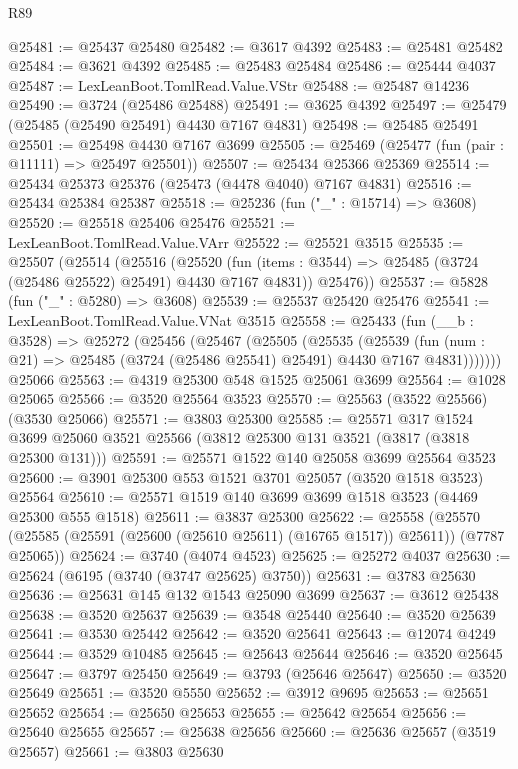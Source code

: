 \begin{lexlean}{R89}
\begin{coremodule}
@25481 := @25437 @25480
@25482 := @3617 @4392
@25483 := @25481 @25482
@25484 := @3621 @4392
@25485 := @25483 @25484
@25486 := @25444 @4037
@25487 := LexLeanBoot.TomlRead.Value.VStr
@25488 := @25487 @14236
@25490 := @3724 (@25486 @25488)
@25491 := @3625 @4392
@25497 := @25479 (@25485 (@25490 @25491) @4430 @7167 @4831)
@25498 := @25485 @25491
@25501 := @25498 @4430 @7167 @3699
@25505 := @25469 (@25477 (fun (pair : @11111) => @25497 @25501))
@25507 := @25434 @25366 @25369
@25514 := @25434 @25373 @25376 (@25473 (@4478 @4040) @7167 @4831)
@25516 := @25434 @25384 @25387
@25518 := @25236 (fun ("_" : @15714) => @3608)
@25520 := @25518 @25406 @25476
@25521 := LexLeanBoot.TomlRead.Value.VArr
@25522 := @25521 @3515
@25535 := @25507
    (@25514
      (@25516
        (@25520 (fun (items : @3544) => @25485 (@3724 (@25486 @25522) @25491) @4430 @7167 @4831))
        @25476))
@25537 := @5828 (fun ("_" : @5280) => @3608)
@25539 := @25537 @25420 @25476
@25541 := LexLeanBoot.TomlRead.Value.VNat @3515
@25558 := @25433
    (fun (__b : @3528) =>
    @25272
      (@25456
        (@25467
          (@25505
            (@25535
              (@25539
                (fun (num : @21) => @25485 (@3724 (@25486 @25541) @25491) @4430 @7167 @4831)))))))
    @25066
@25563 := @4319 @25300 @548 @1525 @25061 @3699
@25564 := @1028 @25065
@25566 := @3520 @25564 @3523
@25570 := @25563 (@3522 @25566) (@3530 @25066)
@25571 := @3803 @25300
@25585 := @25571
    @317
    @1524
    @3699
    @25060
    @3521
    @25566
    (@3812 @25300 @131 @3521 (@3817 (@3818 @25300 @131)))
@25591 := @25571 @1522 @140 @25058 @3699 @25564 @3523
@25600 := @3901 @25300 @553 @1521 @3701 @25057 (@3520 @1518 @3523) @25564
@25610 := @25571 @1519 @140 @3699 @3699 @1518 @3523 (@4469 @25300 @555 @1518)
@25611 := @3837 @25300
@25622 := @25558
    (@25570 (@25585 (@25591 (@25600 (@25610 @25611) (@16765 @1517)) @25611)) (@7787 @25065))
@25624 := @3740 (@4074 @4523)
@25625 := @25272 @4037
@25630 := @25624 (@6195 (@3740 (@3747 @25625) @3750))
@25631 := @3783 @25630
@25636 := @25631 @145 @132 @1543 @25090 @3699
@25637 := @3612 @25438
@25638 := @3520 @25637
@25639 := @3548 @25440
@25640 := @3520 @25639
@25641 := @3530 @25442
@25642 := @3520 @25641
@25643 := @12074 @4249
@25644 := @3529 @10485
@25645 := @25643 @25644
@25646 := @3520 @25645
@25647 := @3797 @25450
@25649 := @3793 (@25646 @25647)
@25650 := @3520 @25649
@25651 := @3520 @5550
@25652 := @3912 @9695
@25653 := @25651 @25652
@25654 := @25650 @25653
@25655 := @25642 @25654
@25656 := @25640 @25655
@25657 := @25638 @25656
@25660 := @25636 @25657 (@3519 @25657)
@25661 := @3803 @25630

\end{coremodule}
\end{lexlean}
